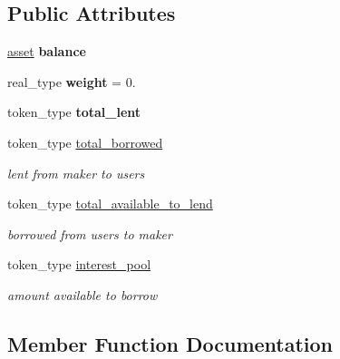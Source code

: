 \subsection*{Public Attributes}
\begin{DoxyCompactItemize}
\item 
\mbox{\label{structconnector_a7ccbf3db174c260f734d246d0a9cf3bd}} 
\mbox{\hyperlink{structasset}{asset}} {\bfseries balance}
\item 
\mbox{\label{structconnector_a294a1d83eccc92c8b2c1b73aaeacd5a6}} 
real\+\_\+type {\bfseries weight} = 0.
\item 
\mbox{\label{structconnector_aacefaaafa13b04d2a738fb9ad707f217}} 
token\+\_\+type {\bfseries total\+\_\+lent}
\item 
\mbox{\label{structconnector_ad971f674c84b91f5035109a21fb1412d}} 
token\+\_\+type \mbox{\hyperlink{structconnector_ad971f674c84b91f5035109a21fb1412d}{total\+\_\+borrowed}}
\begin{DoxyCompactList}\small\item\em lent from maker to users \end{DoxyCompactList}\item 
\mbox{\label{structconnector_a8ad5dc29dd0f408f269bf8d3ad5b6237}} 
token\+\_\+type \mbox{\hyperlink{structconnector_a8ad5dc29dd0f408f269bf8d3ad5b6237}{total\+\_\+available\+\_\+to\+\_\+lend}}
\begin{DoxyCompactList}\small\item\em borrowed from users to maker \end{DoxyCompactList}\item 
\mbox{\label{structconnector_a1d1145b865ad99679492077ccf752b82}} 
token\+\_\+type \mbox{\hyperlink{structconnector_a1d1145b865ad99679492077ccf752b82}{interest\+\_\+pool}}
\begin{DoxyCompactList}\small\item\em amount available to borrow \end{DoxyCompactList}\end{DoxyCompactItemize}


\subsection{Member Function Documentation}
\mbox{\label{structconnector_a40708991ac8ca1e83fac75b482724ca5}} 
